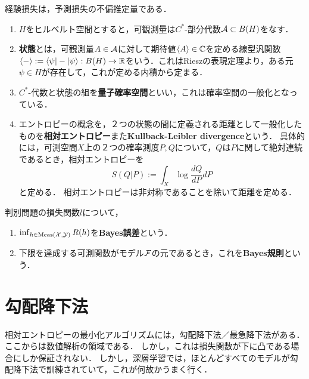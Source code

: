 \documentclass[uplatex,dvipdfmx]{jsreport}
\begin{document}
\begin{lemma}
    経験損失は，予測損失の不偏推定量である．
\end{lemma}

\begin{definition}\mbox{}
    \begin{enumerate}
        \item $H$をヒルベルト空間とすると，可観測量は$C^*$-部分代数$\mathcal{A}\subset B(H)$をなす．
        \item \textbf{状態}とは，可観測量$A\in\mathcal{A}$に対して期待値$\langle A\rangle\in\mathbb{C}$を定める線型汎関数$\langle-\rangle:=\langle\psi|-|\psi\rangle:B(H)\to\mathbb{R}$をいう．これはRieszの表現定理より，ある元$\psi\in H$が存在して，これが定める内積から定まる．
        \item $C^*$-代数と状態の組を\textbf{量子確率空間}といい，これは確率空間の一般化となっている．
        \item エントロピーの概念を，２つの状態の間に定義される距離として一般化したものを\textbf{相対エントロピー}また\textbf{Kullback-Leibler divergence}という．
        具体的には，可測空間$X$上の２つの確率測度$P,Q$について，$Q$は$P$に関して絶対連続であるとき，相対エントロピーを
        \[S(Q|P):=\int_X\log\frac{dQ}{dP}dP\]
        と定める．
        相対エントロピーは非対称であることを除いて距離を定める．
    \end{enumerate}
\end{definition}

\begin{definition}
    判別問題の損失関数$l$について，
    \begin{enumerate}
        \item $\inf_{h\in\mathrm{Meas}(\mathcal{X},\mathcal{Y})}R(h)$を\textbf{Bayes誤差}という．
        \item 下限を達成する可測関数がモデル$\mathcal{F}$の元であるとき，これを\textbf{Bayes規則}という．
    \end{enumerate}
\end{definition}

\section{勾配降下法}

\begin{tcolorbox}[colframe=ForestGreen, colback=ForestGreen!10!white,breakable,colbacktitle=ForestGreen!40!white,coltitle=black,fonttitle=\bfseries\sffamily,
title=]
    相対エントロピーの最小化アルゴリズムには，勾配降下法／最急降下法がある．ここからは数値解析の領域である．
    しかし，これは損失関数が下に凸である場合にしか保証されない．
    しかし，深層学習では，ほとんどすべてのモデルが勾配降下法で訓練されていて，これが何故かうまく行く．
\end{tcolorbox}
\end{document}

